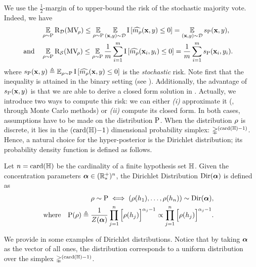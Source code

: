 We use the $\frac{1}{2}$-margin of \citet{LavioletteMorvantRalaivolaRoy2017} to upper-bound the risk of the stochastic majority vote.
Indeed, we have
\begin{align}
    &\operatorname*{\mathbb{E}}_{\rho\sim\mathrm{P}}\text{R}_{\mathcal{D}}(\text{MV}_{\!\rho}) \le \operatorname*{\mathbb{E}}_{\rho\sim\mathrm{P}}\operatorname*{\mathbb{E}}_{(\mathbf{x},y)\sim\mathcal{D}}
    \operatorname{I}\left[ \widehat{m_{\rho}}(\mathbf{x}, y) \le 0\right] = \operatorname*{\mathbb{E}}_{(\mathbf{x},y)\sim\mathcal{D}}s_{\mathrm{P}}(\mathbf{x},y),\label{chap:mv-sto:eq:true-sto-risk}\\
    \text{and}\quad &\operatorname*{\mathbb{E}}_{\rho\sim\mathrm{P}}\text{R}_{\mathcal{S}}(\text{MV}_{\!\rho}) \le \operatorname*{\mathbb{E}}_{\rho\sim\mathrm{P}}\frac{1}{m}\sum_{i=1}^{m}
    \operatorname{I}\left[ \widehat{m_{\rho}}(\mathbf{x}_i, y_i) \le 0\right] = \frac{1}{m}\sum_{i=1}^{m}s_{\mathrm{P}}(\mathbf{x}_i,y_i).\label{chap:mv-sto:eq:emp-sto-risk}
\end{align}
where $s_{\mathrm{P}}(\mathbf{x},y) \triangleq \operatorname*{\mathbb{E}}_{\rho\sim\mathrm{P}}\operatorname{I}\left[ \widehat{m_{\rho}}(\mathbf{x}, y) \le 0\right]$ is the {\it stochastic} risk.
Note first that the inequality is attained in the binary setting (see ).
Additionally, the advantage of $s_{\mathrm{P}}(\mathbf{x},y)$ is that we are able to derive a closed form solution in .
Actually, we introduce two ways to compute this risk: we can either {\it (i)} approximate it (\eg, through Monte Carlo methods) or {\it (ii)} compute its closed form.
In both cases, assumptions have to be made on the distribution $\mathrm{P}$.
When the distribution $\rho$ is discrete, it lies in the ($\operatorname{card}(\mathbb{H}){-}1$) dimensional probability simplex: $\mathbb{\Delta}^{(\operatorname{card}(\mathbb{H}){-}1)}$.
Hence, a natural choice for the hyper-posterior is the Dirichlet  distribution; its probability density function is defined as follows.
\begin{definition} Let $n=\operatorname{card}(\mathbb{H})$ be the cardinality of a finite hypothesis set $\mathbb{H}$. 
Given the concentration parameters $\boldsymbol{\alpha}\in(\mathbb{R}^{+}_{*})^n$, the Dirichlet Distribution $\textrm{Dir}(\boldsymbol{\alpha})$ is defined as
\begin{align*}
    \rho\sim\mathrm{P} \iff (\rho(h_1),\dots,\rho(h_n)) \sim\textrm{Dir}(\boldsymbol{\alpha}),\\
    \text{where}\quad \mathrm{P}(\rho) \triangleq \frac{1}{Z(\boldsymbol{\alpha})}\prod_{j=1}^n \Big[\rho(h_j)\Big]^{\alpha_j-1} \propto \prod_{j=1}^n \Big[\rho(h_j)\Big]^{\alpha_j-1}.
\end{align*}
\label{chap:mv-sto:def:dirichlet}
\end{definition}

We provide in  some examples of Dirichlet distributions.
Notice that by taking $\boldsymbol{\alpha}$ as the vector of all ones, the distribution corresponds to a uniform distribution over the simplex $\mathbb{\Delta}^{(\operatorname{card}(\mathbb{H}){-}1)}$.

